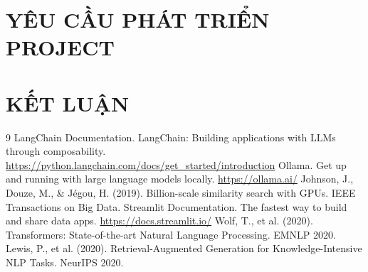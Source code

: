 \documentclass[12pt,a4paper]{report}
\begin{document}
\chapter{YÊU CẦU PHÁT TRIỂN PROJECT}

\chapter{KẾT LUẬN}

\begin{thebibliography}{9}
 LangChain Documentation. LangChain: Building applications with LLMs through composability. \url{https://python.langchain.com/docs/get_started/introduction}
 Ollama. Get up and running with large language models locally. \url{https://ollama.ai/}
 Johnson, J., Douze, M., \& Jégou, H. (2019). Billion-scale similarity search with GPUs. IEEE Transactions on Big Data.
 Streamlit Documentation. The fastest way to build and share data apps. \url{https://docs.streamlit.io/}
 Wolf, T., et al. (2020). Transformers: State-of-the-art Natural Language Processing. EMNLP 2020.
 Lewis, P., et al. (2020). Retrieval-Augmented Generation for Knowledge-Intensive NLP Tasks. NeurIPS 2020.
\end{thebibliography}
\end{document}
